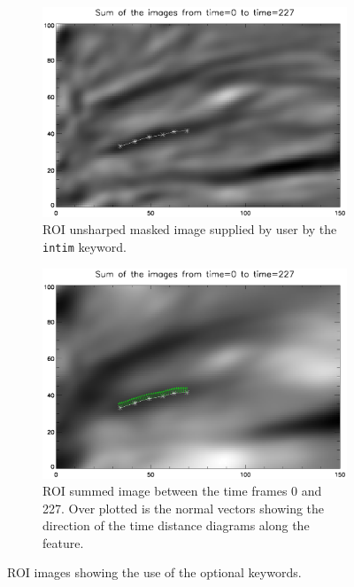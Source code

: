 \documentclass[11pt]{article}
\begin{document}
\begin{figure}[t!]
\centering
\begin{subfigure}{7cm}
\includegraphics[scale=0.47, clip=true, viewport=1.5cm 1cm 18cm 13cm]{unsh}
\caption{ROI unsharped masked image supplied by user by the \texttt{intim} keyword. \tiny}
\label{unsh}
\end{subfigure}
\hfill    
\begin{subfigure}{7cm}
\includegraphics[scale=0.47, clip=true, viewport=1.5cm 1cm 18cm 13cm]{vec}
\caption{ROI summed image between the time frames 0 and 227. Over plotted is the normal vectors showing the direction of the time distance diagrams along the feature.\tiny}
\label{vec}
\end{subfigure}
\caption{ROI images showing the use of the  optional keywords.\tiny}
\end{figure}
\end{document}
